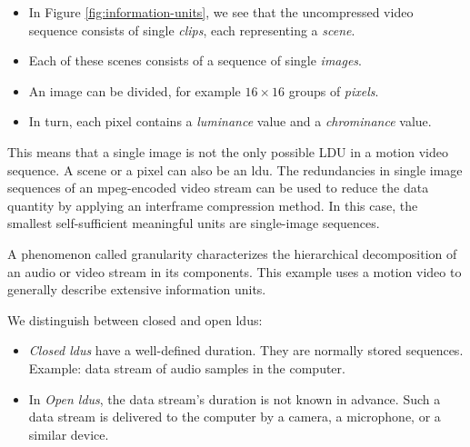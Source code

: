 \begin{itemize}
	\item In Figure {\ref{fig:information-units}}, we see that the uncompressed video sequence consists of single \textit{clips}, each representing a \textit{scene}.
	\item Each of these scenes consists of a sequence of single \textit{images}.
	\item An image can be divided, for example \(16\times16\) groups of \textit{pixels}.
	\item In turn, each pixel contains a \textit{luminance} value and a \textit{chrominance} value.
\end{itemize}

This means that a single image is not the only possible LDU in a motion video sequence. A scene or a pixel can also be an \gls{ldu}. The redundancies in single image sequences of an \gls{mpeg}-encoded video stream can be used to reduce the data quantity by applying an interframe compression method. In this case, the
smallest self-sufficient meaningful units are single-image sequences.



A phenomenon called granularity characterizes the hierarchical decomposition of
an audio or video stream in its components. This example uses a motion video to generally describe extensive information units. 

We distinguish between closed and open \gls{ldu}s:
\begin{itemize}
	\item \textit{Closed \gls{ldu}s} have a well-defined duration. They are normally stored sequences. Example: data stream of audio samples in the computer.
		
	\item In \textit{Open \gls{ldu}s}, the data stream’s duration is not known in advance. Such a data stream is delivered to the computer by a camera, a microphone, or a similar device.
\end{itemize}


\newpage\thispagestyle{empty}
